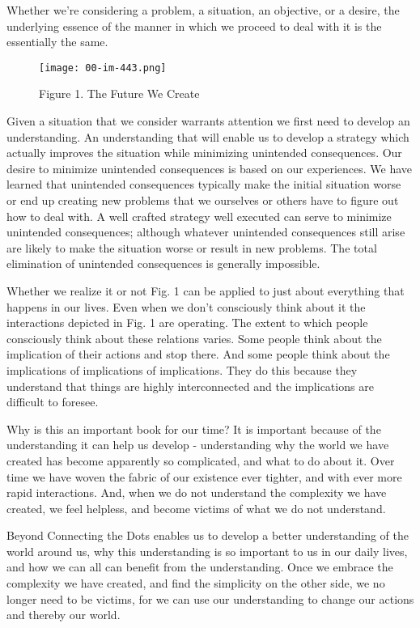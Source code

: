 \documentclass[]{memoir}
\let\Oldincludegraphics\includegraphics
\renewcommand{\includegraphics}[1]{\Oldincludegraphics[max size={\textwidth}{\textheight}]{#1}}
\begin{document}
Whether we're considering a problem, a situation, an objective, or a
desire, the underlying essence of the manner in which we proceed to deal
with it is the essentially the same.

\begin{figure}[htbp]
\centering
\texttt{[image: 00-im-443.png]}
\caption{Figure 1. The Future We Create}
\end{figure}

Given a situation that we consider warrants attention we first need to
develop an understanding. An understanding that will enable us to
develop a strategy which actually improves the situation while
minimizing unintended consequences. Our desire to minimize unintended
consequences is based on our experiences. We have learned that
unintended consequences typically make the initial situation worse or
end up creating new problems that we ourselves or others have to figure
out how to deal with. A well crafted strategy well executed can serve to
minimize unintended consequences; although whatever unintended
consequences still arise are likely to make the situation worse or
result in new problems. The total elimination of unintended consequences
is generally impossible.

Whether we realize it or not Fig. 1 can be applied to just about
everything that happens in our lives. Even when we don't consciously
think about it the interactions depicted in Fig. 1 are operating. The
extent to which people consciously think about these relations varies.
Some people think about the implication of their actions and stop there.
And some people think about the implications of implications of
implications. They do this because they understand that things are
highly interconnected and the implications are difficult to foresee.

Why is this an important book for our time? It is important because of
the understanding it can help us develop - understanding why the world
we have created has become apparently so complicated, and what to do
about it. Over time we have woven the fabric of our existence ever
tighter, and with ever more rapid interactions. And, when we do not
understand the complexity we have created, we feel helpless, and become
victims of what we do not understand.

Beyond Connecting the Dots enables us to develop a better understanding
of the world around us, why this understanding is so important to us in
our daily lives, and how we can all can benefit from the understanding.
Once we embrace the complexity we have created, and find the simplicity
on the other side, we no longer need to be victims, for we can use our
understanding to change our actions and thereby our world.
\end{document}
